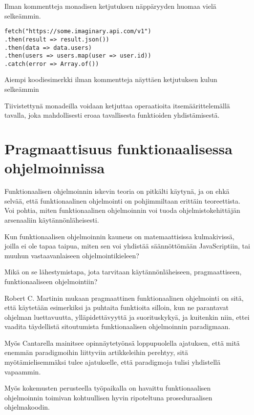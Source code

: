 Ilman kommentteja monadisen ketjutuksen näppäryyden huomaa vielä selkeämmin.

\begin{code}
    \begin{verbatim}
fetch("https://some.imaginary.api.com/v1") 
.then(result => result.json()) 
.then(data => data.users)
.then(users => users.map(user => user.id))
.catch(error => Array.of()) 
    \end{verbatim}
    \caption{Aiempi koodiesimerkki ilman kommentteja näyttäen ketjutuksen kulun selkeämmin}
    \label{code:promise_monad_concise}
\end{code}


Tiivistettynä monadeilla voidaan ketjuttaa operaatioita itsemäärittelemällä tavalla, joka mahdollisesti eroaa tavallisesta funktioiden yhdistämisestä.


\section{Pragmaattisuus funktionaalisessa ohjelmoinnissa}

Funktionaalisen ohjelmoinnin iskevin teoria on pitkälti käytynä, ja on ehkä selvää, että funktionaalinen ohjelmointi on pohjimmiltaan erittäin teoreettista. Voi pohtia, miten funktionaalinen ohjelmoinnin voi tuoda ohjelmistokehittäjän arsenaaliin käytännönläheisesti.

Kun funktionaalisen ohjelmoinnin kauneus on matemaattisissa kulmakivissä, joilla ei ole tapaa taipua, miten sen voi yhdistää säännöttömään JavaScriptiin, tai muuhun vastaavanlaiseen ohjelmointikieleen?

Mikä on se lähestymistapa, jota tarvitaan käytännönläheiseen, pragmaattiseen, funktionaaliseen ohjelmointiin?

Robert C. Martinin mukaan pragmaattinen funktionaalinen ohjelmointi on sitä, että käytetään esimerkiksi  ja puhtaita funktioita silloin, kun ne parantavat ohjelman luettavuutta, ylläpidettävyyttä ja suorituskykyä, ja kuitenkin niin, ettei vaadita täydellistä sitoutumista funktionaalisen ohjelmoinnin paradigmaan. \citep{martin2017pragmaticfp}

Myös Cantarella mainitsee opinnäytetyönsä loppupuolella ajatuksen, että mitä enemmän paradigmoihin liittyviin artikkeleihin perehtyy, sitä myötämielisemmäksi tulee ajatukselle, että paradigmoja tulisi yhdistellä vapaammin. \citep[45]{cantarella_fp_haitat}

Myös kokemusten perusteella työpaikalla on havaittu funktionaalisen ohjelmoinnin toimivan kohtuullisen hyvin ripoteltuna proseduraalisen ohjelmakoodin.

